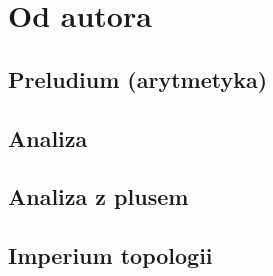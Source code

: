 \begin{multicols*}{2}
	\raggedcolumns
	\tableofcontents %
\end{multicols*} \newpage

\chapter*{Od autora}
	
\newpage

\begin{multicols*}{2}
	\raggedcolumns
	\chapter{Preludium (arytmetyka)}
	
	
	
	
	
	
\end{multicols*}

\begin{multicols*}{2} \raggedcolumns \chapter{Analiza}
	
	
	
	
	
	
	
\end{multicols*}

\begin{multicols*}{2} \raggedcolumns \chapter{Analiza z plusem}
	
	
	
	
	
	
	
	
	 
	
\end{multicols*}

\begin{multicols*}{2} \raggedcolumns \chapter{Imperium topologii}
	
	
	
	
	
	
\end{multicols*}

